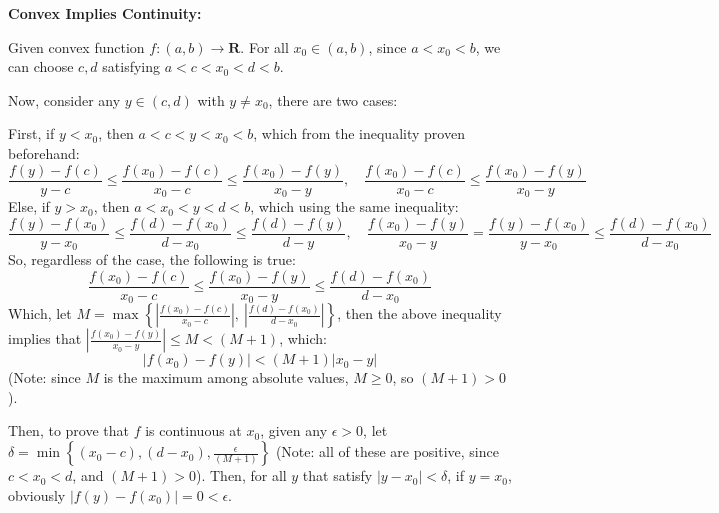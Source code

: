 \documentclass{article}
\begin{document}
\begin{itemize}
\begin{comment}
    So, for the arbitrary $\epsilon >0$, choose $\delta = \min\left\{(x_0-e),(f-x_0),\frac{\epsilon}{(M+1)}\right\} >0$ (Note: all of these are positive, since $e<x_0<f$, and $(M+1)>0$). Then, for all $y$ that satisfy $|y-x_0| < \delta$, if $y=x_0$, obviously $|f(y)-f(x_0)| = 0 < \epsilon$.
    
    Else, if $y\neq x_0$, the following is true:
    $$-\delta < (y-x_0) < \delta,\quad (x_0-\delta) < y < (x_0 + \delta)$$
    Also, since $\delta \leq (f-x_0)$ and $\delta \leq (x_0-e)$ (which $-\delta \geq -(x_0-e)$), the following is true:
    $$e = (x_0-(x_0-e)) \leq (x_0-\delta) < y < (x_0 + \delta) \leq (x_0+(f-x_0)) = f$$
    So, $e<y<f$ (or $y\in(e,f)$). Now, based on the inequality proven above, we have:
    $$|f(y)-f(x_0)| < (M+1)|y-x_0| < (M+1)\delta \leq (M+1)\frac{\epsilon}{(M+1)} = \epsilon$$
    Which we deduced $|f(y)-f(x_0)| < \epsilon$, showing that $f$ is continuous at $x_0$. Since the choice of $x_0\in(a,b)$ is arbitrary, this proves that $f$ is continuous on $(a,b)$.
\end{comment}

    \textbf{Convex Implies Continuity:}

    Given convex function $f:(a,b)\rightarrow \mathbf{R}$. For all $x_0\in (a,b)$, since $a<x_0<b$, we can choose $c,d$ satisfying $a<c<x_0<d<b$.

    Now, consider any $y\in(c,d)$ with $y\neq x_0$, there are two cases:

    First, if $y<x_0$, then $a<c<y<x_0<b$, which from the inequality proven beforehand:
    $$\frac{f(y)-f(c)}{y-c} \leq \frac{f(x_0)-f(c)}{x_0-c} \leq \frac{f(x_0)-f(y)}{x_0-y},\quad \frac{f(x_0)-f(c)}{x_0-c} \leq \frac{f(x_0)-f(y)}{x_0-y}$$
    Else, if $y>x_0$, then $a<x_0<y<d<b$, which using the same inequality:
    $$\frac{f(y)-f(x_0)}{y-x_0} \leq \frac{f(d)-f(x_0)}{d-x_0} \leq \frac{f(d)-f(y)}{d-y},\quad \frac{f(x_0)-f(y)}{x_0-y}=\frac{f(y)-f(x_0)}{y-x_0} \leq \frac{f(d)-f(x_0)}{d-x_0}$$
    So, regardless of the case, the following is true:
    $$\frac{f(x_0)-f(c)}{x_0-c} \leq \frac{f(x_0)-f(y)}{x_0-y} \leq \frac{f(d)-f(x_0)}{d-x_0}$$
    Which, let $M = \max\left\{\left|\frac{f(x_0)-f(c)}{x_0-c}\right|,\ \left|\frac{f(d)-f(x_0)}{d-x_0}\right|\right\}$, then the above inequality implies that $\left|\frac{f(x_0)-f(y)}{x_0-y}\right| \leq M < (M+1)$, which:
    $$|f(x_0)-f(y)| < (M+1)|x_0-y|$$
    (Note: since $M$ is the maximum among absolute values, $M \geq 0$, so $(M+1) >0$).

    Then, to prove that $f$ is continuous at $x_0$, given any $\epsilon >0$, let $\delta = \min\left\{(x_0-c), (d-x_0), \frac{\epsilon}{(M+1)}\right\}$ 
    (Note: all of these are positive, since $c<x_0<d$, and $(M+1)>0$). Then, for all $y$ that satisfy $|y-x_0| < \delta$, if $y=x_0$, obviously $|f(y)-f(x_0)| = 0 < \epsilon$.
    

\end{itemize}
\end{document}
